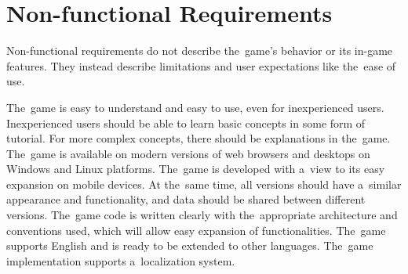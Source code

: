 \section{Non-functional Requirements}

Non-functional requirements do not describe the~game's behavior or its in-game features.
They instead describe limitations and user expectations like the~ease of use.

\begin{enumerate}[label=\textbf{N\arabic*}, ref=N\arabic*]
     The~game is easy to understand and easy to use, even for inexperienced users.
    Inexperienced users should be able to learn basic concepts in some form of tutorial.
    For more complex concepts, there should be explanations in the~game.
     The~game is available on modern versions of web browsers and desktops on Windows and Linux platforms.
    The~game is developed with a~view to its easy expansion on mobile devices.
    At the~same time, all versions should have a~similar appearance and functionality, and data should be shared between different versions.
     The~game code is written clearly with the~appropriate architecture and conventions used, which will allow easy expansion of functionalities.
     The~game supports English and is ready to be extended to other languages.
    The~game implementation supports a~localization system. 
\end{enumerate}
